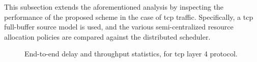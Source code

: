 %    
%    

This subsection extends the aforementioned analysis by inspecting the performance of the proposed scheme in the case of \gls{tcp} traffic. Specifically, a \gls{tcp} full-buffer source model is used, and the various semi-centralized resource allocation policies are compared against the distributed scheduler.

\begin{figure}[tbp]
\centering
  \hfill
   \caption{End-to-end delay and throughput statistics, for \gls{tcp} layer 4 protocol.}
  \label{Fig:TCP_ECDFs}
    \vspace{-.3cm} 

\end{figure}


